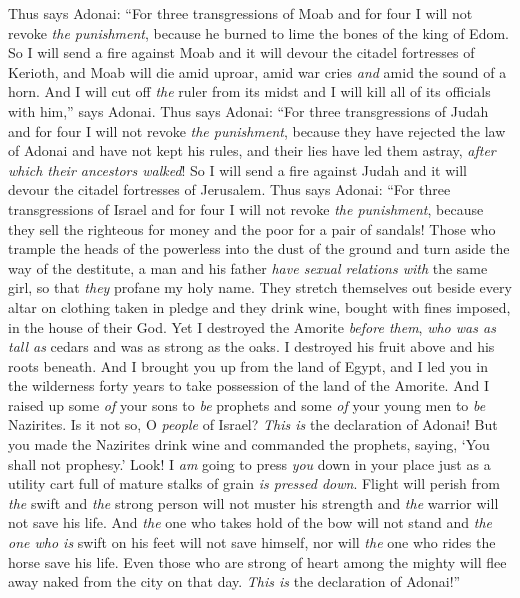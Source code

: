 \begin{biblechapter} %
\verse Thus says Adonai: “For three transgressions of Moab and for four I will not revoke \textit{the punishment}, because he burned to lime the bones of the king of Edom.
\verse So I will send a fire against Moab and it will devour the citadel fortresses of Kerioth, and Moab will die amid uproar, amid war cries \textit{and} amid the sound of a horn.
\verse And I will cut off \textit{the} ruler from its midst and I will kill all of its officials with him,” says Adonai.
 Thus says Adonai: “For three transgressions of Judah and for four I will not revoke \textit{the punishment}, because they have rejected the law of Adonai and have not kept his rules, and their lies have led them astray, \textit{after which their ancestors walked}!
\verse So I will send a fire against Judah and it will devour the citadel fortresses of Jerusalem.
 Thus says Adonai: “For three transgressions of Israel and for four I will not revoke \textit{the punishment}, because they sell the righteous for money and the poor for a pair of sandals!
\verse Those who trample the heads of the powerless into the dust of the ground and turn aside the way of the destitute, a man and his father \textit{have sexual relations with} the same girl, so that \textit{they} profane my holy name.
\verse They stretch themselves out beside every altar on clothing taken in pledge and they drink wine, bought with fines imposed, in the house of their God.
\verse Yet I destroyed the Amorite \textit{before them}, \textit{who was as tall as} cedars and was as strong as the oaks. I destroyed his fruit above and his roots beneath.
\verse And I brought you up from the land of Egypt, and I led you in the wilderness forty years to take possession of the land of the Amorite.
\verse And I raised up some \textit{of} your sons to \textit{be} prophets and some \textit{of} your young men to \textit{be} Nazirites. Is it not so, O \textit{people} of Israel? \textit{This is} the declaration of Adonai!
\verse But you made the Nazirites drink wine and commanded the prophets, saying, ‘You shall not prophesy.’
\verse Look! I \textit{am} going to press \textit{you} down in your place just as a utility cart full of mature stalks of grain \textit{is pressed down}.
\verse Flight will perish from \textit{the} swift and \textit{the} strong person will not muster his strength and \textit{the} warrior will not save his life.
\verse And \textit{the} one who takes hold of the bow will not stand and \textit{the one who is} swift on his feet will not save himself, nor will \textit{the} one who rides the horse save his life.
\verse Even those who are strong of heart among the mighty will flee away naked from the city on that day. \textit{This is} the declaration of Adonai!”
\end{biblechapter}

